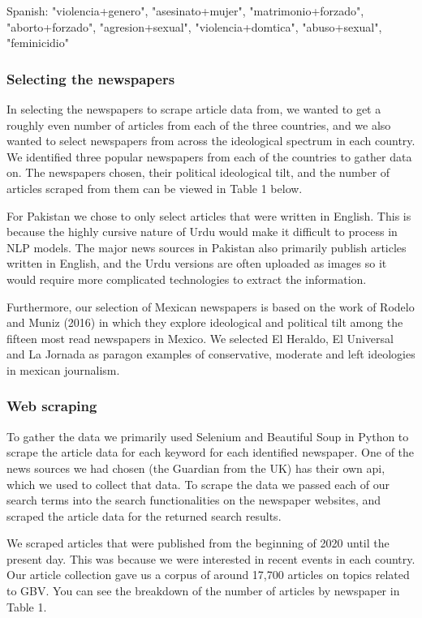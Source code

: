 \documentclass{article}
\begin{document}
{{{Spanish: {"violencia+genero", "asesinato+mujer", "matrimonio+forzado", "aborto+forzado", "agresion+sexual", "violencia+domtica", "abuso+sexual", "feminicidio"}
                }
\subsubsection{Selecting the newspapers}{ 
In selecting the newspapers to scrape article data from, we wanted to get a roughly even number of articles from each of the three countries, and we also wanted to select newspapers from across the ideological spectrum in each country. We identified three popular newspapers from each of the countries to gather data on. The newspapers chosen, their political ideological tilt, and the number of articles scraped from them can be viewed in Table 1 below.

For Pakistan we chose to only select articles that were written in English. This is because the highly cursive nature of Urdu would make it difficult to process in NLP models. The major news sources in Pakistan also primarily publish articles written in English, and the Urdu versions are often uploaded as images so it would require more complicated technologies to extract the information.

Furthermore, our selection of Mexican newspapers is based on the work of Rodelo and Muniz (2016) in which they explore ideological and political tilt among the fifteen most read newspapers in Mexico. We selected El Heraldo, El Universal and La Jornada as paragon examples of conservative, moderate and left ideologies in mexican journalism.}

\subsubsection{Web scraping}{
To gather the data we primarily used Selenium and Beautiful Soup in Python to scrape the article data for each keyword for each identified newspaper. One of the news sources we had chosen (the Guardian from the UK) has their own api, which we used to collect that data. To scrape the data we passed each of our search terms into the search functionalities on the newspaper websites, and scraped the article data for the returned search results. 

We scraped articles that were published from the beginning of 2020 until the present day. This was because we were interested in recent events in each country. Our article collection gave us a corpus of around 17,700 articles on topics related to GBV. You can see the breakdown of the number of articles by newspaper in Table 1.}

}}
\end{document}
